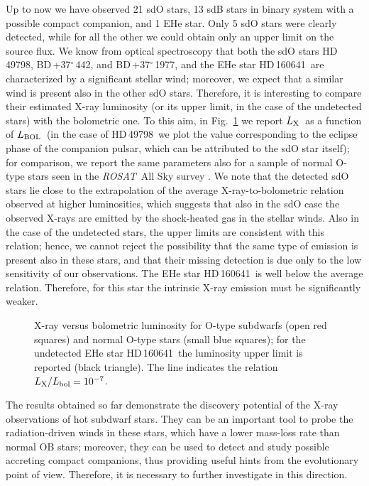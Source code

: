 \documentclass[USenglish,twocolumn]{article}
\def\ROSAT{{\em ROSAT}}
\def\BDone{BD\,+37$^\circ$\,442}
\def\BDtwo{BD\,+37$^\circ$\,1977}
\def\HDone{HD\,49798}
\def\HDtwo{HD\,160641}
\def\lx {$L_{\rm X}$}
\def\lbol {$L_{\rm BOL}$}
\begin{document}
Up to now we have observed 21 sdO stars, 13 sdB stars in binary system with a possible compact companion, and 1 EHe star. Only 5 sdO stars were clearly detected, while for all the other we could obtain only an upper limit on the source flux. We know from optical spectroscopy that both the sdO stars \HDone, \BDone, and \BDtwo, and the EHe star \HDtwo\ are characterized by a significant stellar wind; moreover, we expect that a similar wind is present also in the other sdO stars. Therefore, it is interesting to compare their estimated X-ray luminosity (or its upper limit, in the case of the undetected stars) with the bolometric one. To this aim, in Fig.~\ref{lxlbol} we report \lx\ as a function of \lbol\ (in the case of \HDone\ we plot the value corresponding to the eclipse phase of the companion pulsar, which can be attributed to the sdO star itself); for comparison, we report the same parameters also for a sample of normal O-type stars seen in the \ROSAT\ All Sky survey \citep{Berghoefer+96}. We note that the detected sdO stars lie close to the extrapolation of the average X-ray-to-bolometric relation observed at higher luminosities, which suggests that also in the sdO case the observed X-rays are emitted by the shock-heated gas in the stellar winds. Also in the case of the undetected stars, the upper limits are consistent with this relation; hence, we cannot reject the possibility that the same type of emission is present also in these stars, and that their missing detection is due only to the low sensitivity of our observations. The EHe star \HDtwo\ is well below the average relation. Therefore, for this star the intrinsic X-ray emission must be significantly weaker.

\begin{figure}[t!]
\centering
\vspace{-0.5cm}
\caption{\footnotesize{X-ray versus bolometric luminosity for O-type subdwarfs (open red squares) and normal O-type stars (small blue squares); for the undetected EHe star \HDtwo\ the luminosity upper limit is reported (black triangle). The line indicates the relation $L_{\rm X} / L_{\rm bol} = 10^{-7}$.}}
\label{lxlbol}
\vspace{-0.5cm}
\end{figure}

The results obtained so far demonstrate the discovery potential of the X-ray observations of hot subdwarf stars. They can be an important tool to probe the radiation-driven winds in these stars, which have a lower mass-loss rate than normal OB stars; moreover, they can be used to detect and study possible accreting compact companions, thus providing useful hints from the evolutionary point of view. Therefore, it is necessary to further investigate in this direction.
\end{document}
